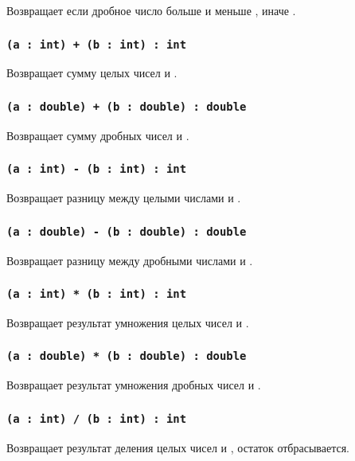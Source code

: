 Возвращает \true{} если дробное число  больше  и меньше , иначе \false{}.


\subsubsection{\lstinline|(a : int) + (b : int) : int|}

Возвращает сумму целых чисел  и .

\subsubsection{\lstinline|(a : double) + (b : double) : double|}

Возвращает сумму дробных чисел  и .

\subsubsection{\lstinline|(a : int) - (b : int) : int|}

Возвращает разницу между целыми числами  и .

\subsubsection{\lstinline|(a : double) - (b : double) : double|}

Возвращает разницу между дробными числами  и .

\subsubsection{\lstinline|(a : int) * (b : int) : int|}

Возвращает результат умножения целых чисел  и .

\subsubsection{\lstinline|(a : double) * (b : double) : double|}

Возвращает результат умножения дробных чисел  и .

\subsubsection{\lstinline|(a : int) / (b : int) : int|}

Возвращает результат деления целых чисел  и , остаток отбрасывается.

